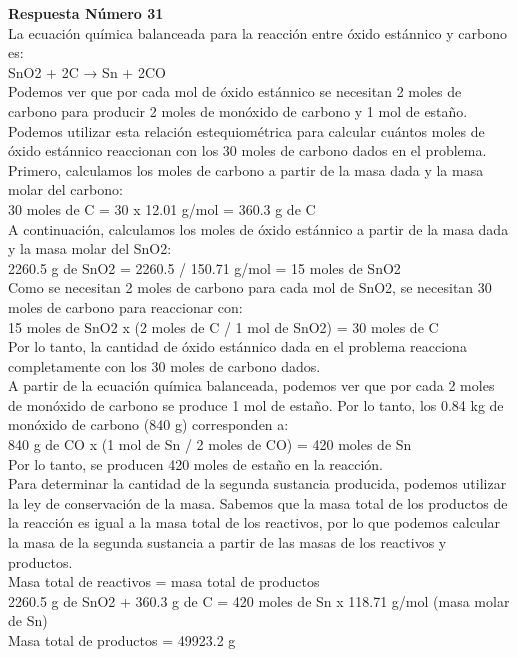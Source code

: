 \documentclass{article}
\begin{document}
\textbf{Respuesta Número 31} \\
La ecuación química balanceada para la reacción entre óxido estánnico y carbono es:\\
SnO2 + 2C → Sn + 2CO\\
Podemos ver que por cada mol de óxido estánnico se necesitan 2 moles de carbono para producir 2 moles de monóxido de carbono y 1 mol de estaño. Podemos utilizar esta relación estequiométrica para calcular cuántos moles de óxido estánnico reaccionan con los 30 moles de carbono dados en el problema.\\
Primero, calculamos los moles de carbono a partir de la masa dada y la masa molar del carbono:\\
30 moles de C = 30 x 12.01 g/mol = 360.3 g de C\\
A continuación, calculamos los moles de óxido estánnico a partir de la masa dada y la masa molar del SnO2:\\
2260.5 g de SnO2 = 2260.5 / 150.71 g/mol = 15 moles de SnO2\\
Como se necesitan 2 moles de carbono para cada mol de SnO2, se necesitan 30 moles de carbono para reaccionar con:\\
15 moles de SnO2 x (2 moles de C / 1 mol de SnO2) = 30 moles de C\\
Por lo tanto, la cantidad de óxido estánnico dada en el problema reacciona completamente con los 30 moles de carbono dados.\\
A partir de la ecuación química balanceada, podemos ver que por cada 2 moles de monóxido de carbono se produce 1 mol de estaño. Por lo tanto, los 0.84 kg de monóxido de carbono (840 g) corresponden a:\\
840 g de CO x (1 mol de Sn / 2 moles de CO) = 420 moles de Sn\\
Por lo tanto, se producen 420 moles de estaño en la reacción.\\
Para determinar la cantidad de la segunda sustancia producida, podemos utilizar la ley de conservación de la masa. Sabemos que la masa total de los productos de la reacción es igual a la masa total de los reactivos, por lo que podemos calcular la masa de la segunda sustancia a partir de las masas de los reactivos y productos.\\
Masa total de reactivos = masa total de productos\\
2260.5 g de SnO2 + 360.3 g de C = 420 moles de Sn x 118.71 g/mol (masa molar de Sn)\\
Masa total de productos = 49923.2 g\\
\end{document}
